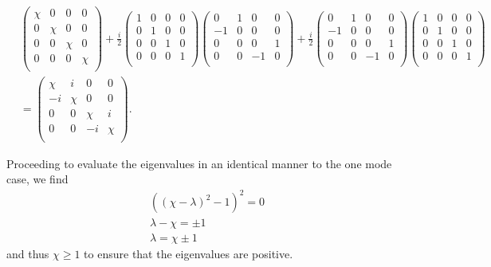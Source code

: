 \documentclass[11pt,a4paper]{article}
\numberwithin{equation}{section}
\begin{document}
	\begin{align*}
	&\begin{pmatrix}
	\chi & 0 & 0 & 0\\
	0 & \chi & 0 & 0\\
	0 & 0 & \chi & 0 \\
	0 & 0 & 0 & \chi\\
	\end{pmatrix} + \frac{i}{2}\begin{pmatrix}
	1 & 0 & 0 & 0\\
	0 & 1 & 0 & 0\\
	0 & 0 & 1 & 0 \\
	0 & 0 & 0 & 1\\
	\end{pmatrix}\begin{pmatrix}
	0 & 1 & 0 & 0 \\
	-1 & 0 & 0 & 0\\
	0 & 0 & 0 & 1\\
	0 & 0 & -1 & 0\\
	\end{pmatrix} + \frac{i}{2}\begin{pmatrix}
	0 & 1 & 0 & 0 \\
	-1 & 0 & 0 & 0\\
	0 & 0 & 0 & 1\\
	0 & 0 & -1 & 0\\
	\end{pmatrix}\begin{pmatrix}
	1 & 0 & 0 & 0\\
	0 & 1 & 0 & 0\\
	0 & 0 & 1 & 0 \\
	0 & 0 & 0 & 1\\
	\end{pmatrix}&\\
	&=\begin{pmatrix}
	\chi & i & 0 & 0 \\
	-i & \chi & 0 & 0\\
	0 & 0 & \chi & i\\
	0 & 0 & -i & \chi\\
	\end{pmatrix}.
	\end{align*}
	
	Proceeding to evaluate the eigenvalues in an identical manner to the one mode case, we find
	\begin{align*}
    &((\chi-\lambda)^2 - 1)^2=0&\\
        &\lambda-\chi=\pm1&\\
	&\lambda = \chi \pm 1&
	\end{align*}
	and thus $\chi \geq 1$ to ensure that the eigenvalues are positive.
	
\end{document}

